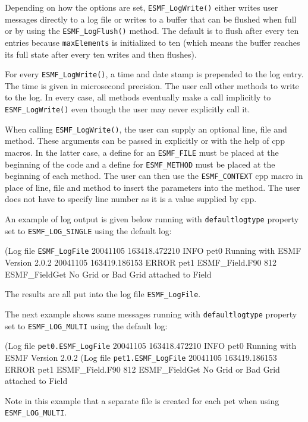 Depending on how the options are set, {\tt ESMF\_LogWrite()} either writes user
messages directly to a log file or writes to a buffer that can be flushed when 
full or by using the {\tt ESMF\_LogFlush()} method.  The default is to flush 
after every ten entries because {\tt maxElements} is initialized to ten 
(which means the buffer reaches its full state after every ten writes and then
flushes).

For every {\tt ESMF\_LogWrite()}, a time and date stamp is prepended to the
log entry.  The time is given in microsecond precision.  The user call other 
methods to write to the log.  In every case, all methods eventually make a call
implicitly to {\tt ESMF\_LogWrite()} even though the user may never explicitly
call it.

When calling {\tt ESMF\_LogWrite()}, the user can supply an optional line,
file and method.  These arguments can be passed in explicitly or with the help
of cpp macros.  In the latter case, a define for an {\tt ESMF\_FILE} must be 
placed at the beginning of the code and a define for {\tt ESMF\_METHOD} must
be placed at the beginning of each method.  The user can then use the
{\tt ESMF\_CONTEXT} cpp macro in place of line, file and method to insert the 
parameters into the method.  The user does not have to specify line number as
it is a value supplied by cpp.

An example of log output is given below running with {\tt defaultlogtype} 
property set to {\tt ESMF\_LOG\_SINGLE} using the default log:

(Log file {\tt ESMF\_LogFile}
20041105 163418.472210 INFO      pet0     Running with ESMF Version 2.0.2   
20041105 163419.186153 ERROR     pet1     ESMF\_Field.F90             812  
ESMF\_FieldGet No Grid or Bad Grid attached to Field

The results are all put into the log file {\tt ESMF\_LogFile}.

The next example shows same messages running with {\tt defaultlogtype} 
property set to {\tt ESMF\_LOG\_MULTI} using the default log:

(Log file {\tt pet0.ESMF\_LogFile}
20041105 163418.472210 INFO      pet0     Running with ESMF Version 2.0.2   
(Log file {\tt pet1.ESMF\_LogFile}
20041105 163419.186153 ERROR     pet1     ESMF\_Field.F90             812  
ESMF\_FieldGet No Grid or Bad Grid attached to Field

Note in this example that a separate file is created for each pet when using
{\tt ESMF\_LOG\_MULTI}.

